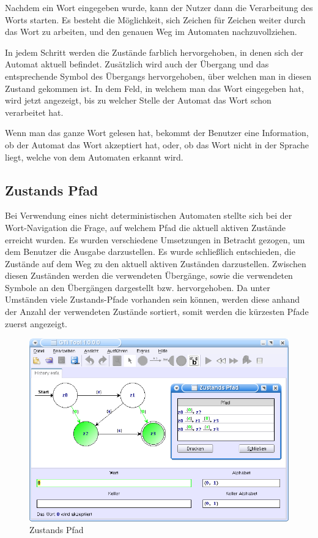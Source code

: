 Nachdem ein Wort eingegeben wurde, kann der Nutzer dann die Verarbeitung des
Worts starten. Es besteht die Möglichkeit, sich Zeichen für Zeichen weiter durch
das Wort zu arbeiten, und den genauen Weg im Automaten nachzuvollziehen.\vspace{10pt}

In jedem Schritt werden die Zustände farblich hervorgehoben, in denen sich der
Automat aktuell befindet. Zusätzlich wird auch der Übergang und das
entsprechende Symbol des Übergangs hervorgehoben, über welchen man in diesen
Zustand gekommen ist. In dem Feld, in welchem man das Wort eingegeben hat, wird
jetzt angezeigt, bis zu welcher Stelle der Automat das Wort schon verarbeitet
hat.\vspace{10pt}

Wenn man das ganze Wort gelesen hat, bekommt der Benutzer eine Information,
ob der Automat das Wort akzeptiert hat, oder, ob das Wort nicht in der Sprache
liegt, welche von dem Automaten erkannt wird.\vspace{10pt}


\subsection{Zustands Pfad}\label{HistoryPath}

Bei Verwendung eines nicht deterministischen Automaten stellte sich bei der
Wort-Navigation die Frage, auf welchem Pfad die aktuell aktiven Zustände
erreicht wurden. Es wurden verschiedene Umsetzungen in Betracht gezogen, um dem
Benutzer die Ausgabe darzustellen. Es wurde schließlich entschieden, die
Zustände auf dem Weg zu den aktuell aktiven Zuständen darzustellen. Zwischen
diesen Zuständen werden die verwendeten Übergänge, sowie die verwendeten
Symbole an den Übergängen dargestellt bzw. hervorgehoben. Da unter Umständen
viele Zustands-Pfade vorhanden sein können, werden diese anhand der Anzahl der
verwendeten Zustände sortiert, somit werden die kürzesten Pfade zuerst
angezeigt.\vspace{10pt}

\begin{figure}[h!]
\begin{center}
\includegraphics[width=12cm]{../images/history_path.png}
\caption{Zustands Pfad}
\end{center}
\end{figure}
\vspace{10pt}

